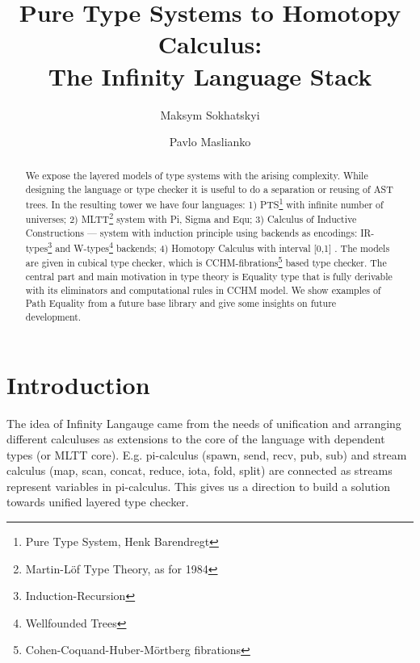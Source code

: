 \documentclass{aip-cp}
\begin{document}
\title{Pure Type Systems to Homotopy Calculus:\\ The Infinity Language Stack}
\author[aff1]{Maksym Sokhatskyi}
\author[aff1]{Pavlo Maslianko}


\maketitle
\begin{abstract}
We expose the layered models of type systems with the arising complexity.
While designing the language or type checker it is useful to do a separation or reusing of AST trees.
In the resulting tower we have four languages:
1) PTS\footnote{Pure Type System, Henk Barendregt} \cite{Erik97} with infinite number of universes;
2) MLTT\footnote{Martin-Löf Type Theory, as for 1984} \cite{Lof84} system with Pi, Sigma and Equ;
3) Calculus of Inductive Constructions \cite{Mohring15} --- system with induction principle using backends as
encodings: IR-types\footnote{Induction-Recursion} \cite{Dagand13} and W-types\footnote{Wellfounded Trees} backends;
4) Homotopy Calculus with interval [0,1] \cite{Mortberg17}. The models are given in cubical type checker,
which is CCHM-fibrations\footnote{Cohen-Coquand-Huber-Mörtberg fibrations} \cite{Orton17} based type checker.
The central part and main motivation in type theory is Equality type that is fully
derivable with its eliminators and computational rules in CCHM model. We show examples of
Path Equality from a future base library and give some insights on future development.
\end{abstract}

\newpage
\tableofcontents
\newpage

\section{Introduction}
The idea of Infinity Langauge came from the needs of unification and
arranging different calculuses as extensions to the core of the language
with dependent types (or MLTT core). E.g. pi-calculus (spawn, send, recv, pub, sub)
and stream calculus (map, scan, concat, reduce, iota, fold, split) are connected
as streams represent variables in pi-calculus. This gives us a direction to build
a solution towards unified layered type checker.
\end{document}
